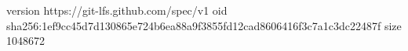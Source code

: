 version https://git-lfs.github.com/spec/v1
oid sha256:1ef9cc45d7d130865e724b6ea88a9f3855fd12cad8606416f3c7a1c3dc22487f
size 1048672
